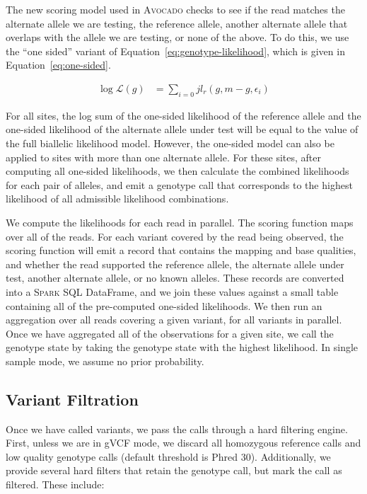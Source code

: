 \documentclass[phd]{ucbthesis}
\begin{document}
The new scoring model used in \textsc{Avocado} checks to see if the read matches
the alternate allele we are testing, the reference allele, another alternate
allele that overlaps with the allele we are testing, or none of the above. 
To do this, we use the ``one sided'' variant of
Equation~\eqref{eq:genotype-likelihood}, which is given in
Equation~\eqref{eq:one-sided}.

\begin{align}
\label{eq:one-sided}
\log \mathcal{L}(g) &= \sum_{i = 0}{j} l_r(g, m - g, \epsilon_i)
\end{align}

For all sites, the log sum of the one-sided likelihood of the reference allele
and the one-sided likelihood of the alternate allele under test will be equal to
the value of the full biallelic likelihood model. However, the one-sided model
can also be applied to sites with more than one alternate allele. For these
sites, after computing all one-sided likelihoods, we then calculate the combined
likelihoods for each pair of alleles, and emit a genotype call that corresponds
to the highest likelihood of all admissible likelihood combinations.

We compute the likelihoods for each read in parallel. The scoring function maps
over all of the reads. For each variant covered by the read being observed, the
scoring function will emit a record that contains the mapping and base
qualities, and whether the read supported the reference allele, the alternate
allele under test, another alternate allele, or no known alleles. These records
are converted into a \textsc{Spark SQL} DataFrame, and we join these values
against a small table containing all of the pre-computed one-sided likelihoods.
We then run an aggregation over all reads covering a given variant, for all
variants in parallel. Once we have aggregated all of the observations for a given
site, we call the genotype state by taking the genotype state with the highest
likelihood. In single sample mode, we assume no prior probability.

\subsection{Variant Filtration}
\label{sec:variant-filtration}

Once we have called variants, we pass the calls through a hard filtering engine.
First, unless we are in gVCF mode, we discard all homozygous reference calls and
low quality genotype calls (default threshold is Phred 30). Additionally, we
provide several hard filters that retain the genotype call, but mark the call as
filtered. These include:
\end{document}
